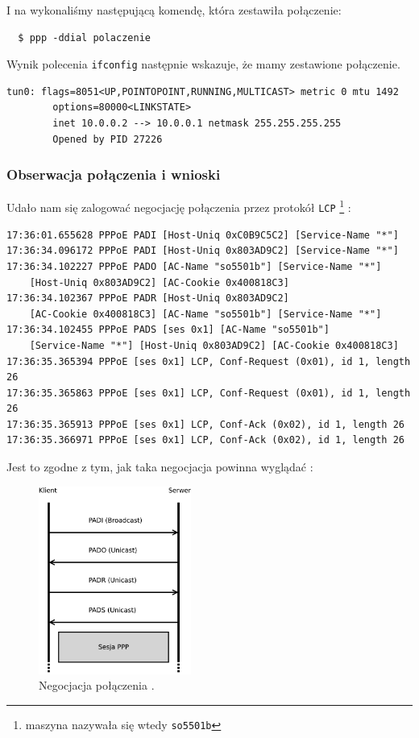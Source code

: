 I na \pppcli{} wykonaliśmy następującą komendę, która zestawiła połączenie:


\begin{lstlisting}
  $ ppp -ddial polaczenie
\end{lstlisting}

Wynik polecenia \texttt{ifconfig} następnie wskazuje, że mamy zestawione połączenie.


\begin{lstlisting}
tun0: flags=8051<UP,POINTOPOINT,RUNNING,MULTICAST> metric 0 mtu 1492
        options=80000<LINKSTATE>
        inet 10.0.0.2 --> 10.0.0.1 netmask 255.255.255.255
        Opened by PID 27226
\end{lstlisting}

\subsubsection{Obserwacja połączenia i wnioski}
Udało nam się zalogować negocjację połączenia przez protokół \texttt{LCP}
\footnote{maszyna \pppserv{} nazywała się wtedy \texttt{so5501b}}
:

\begin{lstlisting}
17:36:01.655628 PPPoE PADI [Host-Uniq 0xC0B9C5C2] [Service-Name "*"]
17:36:34.096172 PPPoE PADI [Host-Uniq 0x803AD9C2] [Service-Name "*"]
17:36:34.102227 PPPoE PADO [AC-Name "so5501b"] [Service-Name "*"] 
    [Host-Uniq 0x803AD9C2] [AC-Cookie 0x400818C3]
17:36:34.102367 PPPoE PADR [Host-Uniq 0x803AD9C2] 
    [AC-Cookie 0x400818C3] [AC-Name "so5501b"] [Service-Name "*"]
17:36:34.102455 PPPoE PADS [ses 0x1] [AC-Name "so5501b"] 
    [Service-Name "*"] [Host-Uniq 0x803AD9C2] [AC-Cookie 0x400818C3]
17:36:35.365394 PPPoE [ses 0x1] LCP, Conf-Request (0x01), id 1, length 26
17:36:35.365863 PPPoE [ses 0x1] LCP, Conf-Request (0x01), id 1, length 26
17:36:35.365913 PPPoE [ses 0x1] LCP, Conf-Ack (0x02), id 1, length 26
17:36:35.366971 PPPoE [ses 0x1] LCP, Conf-Ack (0x02), id 1, length 26
\end{lstlisting}

Jest to zgodne z tym, jak taka negocjacja powinna wyglądać \cite{ppp:stevens-pppoe}:

\begin{figure}[h!]
  \centering
  \includegraphics[width=5cm]{figury/ppp/padi-pado.pdf}
  \caption{Negocjacja połączenia \ppp.}
  \label{fig:ppp:schemat-sieci-przed}
\end{figure}

